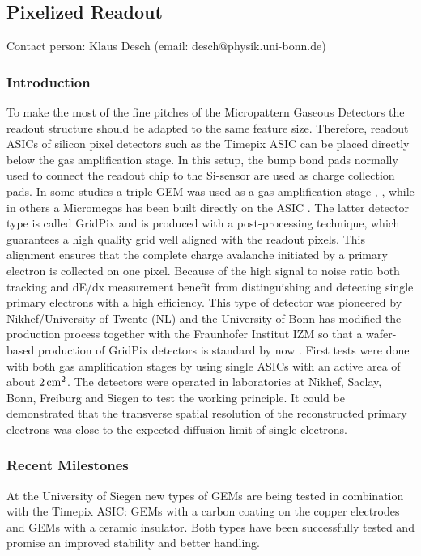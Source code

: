 \subsection{Pixelized Readout}\label{chap:TPC_sec:pixels}
Contact person: Klaus Desch (email: desch@physik.uni-bonn.de)\\

\subsubsection{Introduction}
To make the most of the fine pitches of the Micropattern Gaseous Detectors the
readout structure should be adapted to the same feature size. Therefore,
readout ASICs of silicon pixel detectors such as the Timepix ASIC
\cite{Llopart2007485,Llopart2008106} can be placed directly below the gas amplification
stage. In this setup, the bump bond pads normally used to connect the readout
chip to the Si-sensor are used as charge collection pads. In some studies a
triple GEM was used as a gas amplification stage \cite{Bamberger:2006xp},
\cite{6359808}, while in others a Micromegas has been built
directly on the ASIC \cite{Chefdeville2006490}. The latter detector type is
 called GridPix and is produced with a post-processing technique, which
 guarantees a high quality grid well aligned with the readout pixels. This
 alignment ensures that the complete charge avalanche initiated by a primary
 electron is collected on one pixel. Because of the high signal to noise
 ratio both tracking and dE/dx measurement benefit from distinguishing and
 detecting single primary electrons with a high efficiency. This type of
 detector was pioneered by Nikhef/University of Twente (NL) and the University
 of Bonn has modified the
 production process together with the Fraunhofer Institut IZM so that a
 wafer-based production of GridPix detectors is standard by now
 \cite{Koppert2013245}. First tests were done with both
 gas amplification stages by using single ASICs with an active area of about $\unit[2]{cm^2}$. The detectors were operated in laboratories at Nikhef, Saclay, Bonn,
 Freiburg and Siegen to test the working principle. It could be demonstrated
 that the transverse spatial resolution of the reconstructed primary electrons
 was close to the expected diffusion limit of single electrons.


\subsubsection{Recent Milestones}
At the University of Siegen new types of GEMs are being tested in combination
with the Timepix ASIC: GEMs with a
carbon coating on the copper electrodes and GEMs with a ceramic
insulator. Both types have been successfully tested and promise an improved
stability and better handling.

